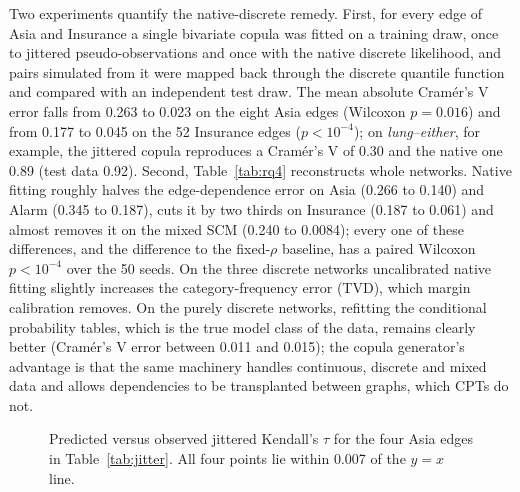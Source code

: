 \documentclass[
  english,
  class=report,
  accentcolor=2c,
  marginpar=false,
  parskip=half-,
  fontsize=11pt,
  ruledheaders=false,
  pdfa=false,
  IMRAD=false,
  thesis={type=master}
]{tudapub}
\begin{document}
Two experiments quantify the native-discrete remedy. First, for every edge
of Asia and Insurance a single bivariate copula was fitted on a training
draw, once to jittered pseudo-observations and once with the native
discrete likelihood, and pairs simulated from it were mapped back through
the discrete quantile function and compared with an independent test draw.
The mean absolute Cram\'er's V error falls from 0.263 to 0.023 on the eight
Asia edges (Wilcoxon $p = 0.016$) and from 0.177 to 0.045 on the 52
Insurance edges ($p < 10^{-4}$); on \emph{lung}--\emph{either}, for
example, the jittered copula reproduces a Cram\'er's V of 0.30 and the
native one 0.89 (test data 0.92). Second, Table~\ref{tab:rq4} reconstructs
whole networks. Native fitting roughly halves the edge-dependence error on
Asia (0.266 to 0.140) and Alarm
(0.345 to 0.187), cuts it by two thirds on Insurance
(0.187 to 0.061) and almost removes it on the mixed
SCM (0.240 to 0.0084); every one of these differences, and
the difference to the fixed-$\rho$ baseline, has a paired Wilcoxon
$p < 10^{-4}$ over the 50 seeds. On the three discrete networks uncalibrated native
fitting slightly increases the category-frequency error (TVD), which
margin calibration removes. On the purely discrete networks, refitting the conditional
probability tables, which is the true model class of the data, remains
clearly better (Cram\'er's V error between 0.011 and 0.015); the
copula generator's advantage is that the same machinery handles continuous,
discrete and mixed data and allows dependencies to be transplanted between
graphs, which CPTs do not.

\begin{figure}[ht]
\centering
{}
\caption{Predicted versus observed jittered Kendall's $\tau$ for the four Asia edges in Table~\ref{tab:jitter}. All four points lie within 0.007 of the $y=x$ line.}
\label{fig:dilution-scatter}
\end{figure}
\end{document}
